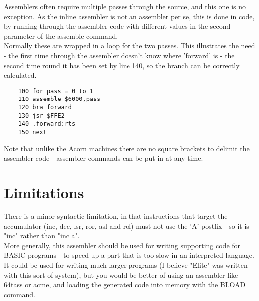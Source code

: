 Assemblers often require multiple passes through the source, and this one is no exception. As the inline assembler is not an assembler per se, this is done in code, by running through the assembler code with different values in the second parameter of the assemble command. \\

Normally these are wrapped in a loop for the two passes. This illustrates the need - the first time through the assembler doesn't know where 'forward' is - the second time round it has been set by line 140, so the branch can be correctly calculated.

\begin{verbatim}
	100 for pass = 0 to 1
	110 assemble $6000,pass
	120 bra forward
	130 jsr $FFE2
	140 .forward:rts
	150 next
\end{verbatim}

Note that unlike the Acorn machines there are no square brackets to delimit the assembler code - assembler commands can be put in at any time. 

\section {Limitations}

There is a minor syntactic limitation, in that instructions that target the accumulator (inc, dec, lsr, ror, asl and rol) must not use the 'A' postfix - so it is "inc" rather than "inc a".\\

More generally, this assembler should be used for writing supporting code for BASIC programs - to speed up a part that is too slow in an interpreted language. It could be used for writing much larger programs (I believe "Elite" was written with this sort of system), but you would be better of using an assembler like 64tass or acme, and loading the generated code into memory with the BLOAD command.


